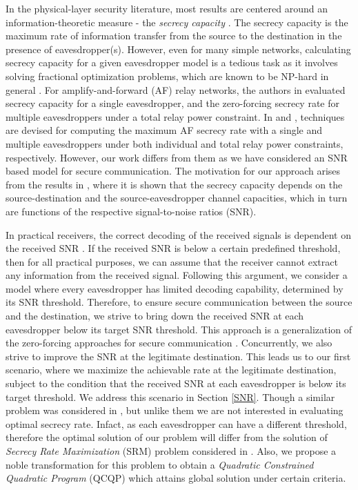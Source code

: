\documentclass[journal,,draftclsnofoot letterpaper, onecolumn]{IEEEtran}
\begin{document}
In the physical-layer security literature, most results are centered around an information-theoretic measure - the \textit{secrecy capacity} \cite{wyner}. The secrecy capacity is the maximum rate of information transfer from the source to the destination in the presence of eavesdropper(s). 
However, even for many simple networks, calculating secrecy capacity for a given eavesdropper model is a tedious task as it involves solving fractional optimization problems, which are known to be NP-hard in general \cite{schaible}. For amplify-and-forward (AF) relay networks, the authors in \cite{dong} evaluated secrecy capacity for a single eavesdropper, and the zero-forcing secrecy rate for multiple eavesdroppers under a total relay power constraint. In \cite{zhang10} and \cite{yang2013cooperative}, techniques are devised for computing the maximum AF secrecy rate with a single and multiple eavesdroppers under both individual and total relay power constraints, respectively. However, our work differs from them as we have considered an SNR based model for secure communication.
The motivation for our approach arises from the results in
\cite{Leung}, where it is shown that the secrecy capacity depends on the source-destination and the source-eavesdropper channel capacities, which in turn are functions of the respective signal-to-noise ratios (SNR).


In practical receivers, the correct decoding of the received signals is dependent on the received SNR \cite{proakisdigital}. If the received SNR is below a certain predefined threshold, then for all practical purposes, we can assume that the receiver cannot extract any information from the received signal. Following this argument, we consider a model where every eavesdropper has limited decoding capability, determined by its SNR threshold. Therefore, to ensure secure communication between the source and the destination, we strive to bring down the received SNR at each eavesdropper below its target SNR threshold. This approach is a generalization of the zero-forcing approaches for secure communication \cite{dong}. Concurrently, we also strive to improve the SNR at the legitimate destination. This leads us to our first scenario, where we maximize the achievable rate at the legitimate destination, subject to the condition that the received SNR at each eavesdropper is below its target threshold. We address this scenario in Section \ref{SNR}. Though a similar problem was considered in \cite{yang2013cooperative}, but unlike them we are not interested in evaluating optimal secrecy rate. Infact, as each eavesdropper can have a different threshold, therefore the optimal solution of our problem will differ from the solution of \textit{Secrecy Rate Maximization} (SRM) problem considered in \cite{yang2013cooperative}. Also, we propose a noble transformation for this problem to obtain a \textit{Quadratic Constrained Quadratic Program} (QCQP) which attains global solution under certain criteria.
\end{document}
